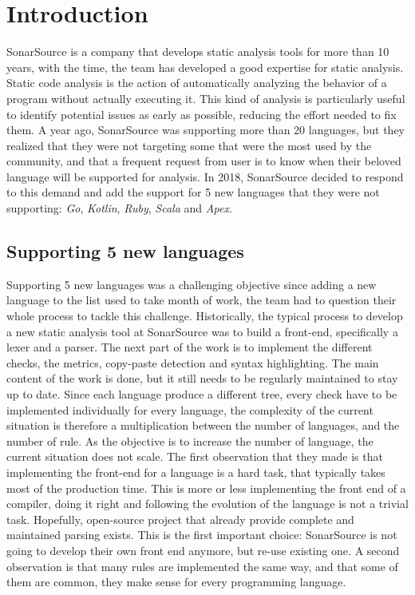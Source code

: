 \section{Introduction}
\label{sec:introduction}
SonarSource is a company that develops static analysis tools for more than 10 years, with the time, the team has developed a good expertise for static analysis.
Static code analysis is the action of automatically analyzing the behavior of a program without actually executing it.
This kind of analysis is particularly useful to identify potential issues as early as possible, reducing the effort needed to fix them.
A year ago, SonarSource was supporting more than 20 languages, but they realized that they were not targeting some that were the most used by the community, and that a frequent request from user is to know when their beloved language will be supported for analysis. 
In 2018, SonarSource decided to respond to this demand and add the support for 5 new languages that they were not supporting: \emph{Go}, \emph{Kotlin}, \emph{Ruby}, \emph{Scala} and \emph{Apex}.

\subsection{Supporting 5 new languages}
\label{subsec:5_new_languages}
Supporting 5 new languages was a challenging objective since adding a new language to the list used to take month of work, the team had to question their whole process to tackle this challenge.
Historically, the typical process to develop a new static analysis tool at SonarSource was to build a front-end, specifically a lexer and a parser.
The next part of the work is to implement the different checks, the metrics, copy-paste detection and syntax highlighting. The main content of the work is done, but it still needs to be regularly maintained to stay up to date.
Since each language produce a different tree, every check have to be implemented individually for every language, the complexity of the current situation is therefore a multiplication between the number of languages, and the number of rule. 
As the objective is to increase the number of language, the current situation does not scale.
The first observation that they made is that implementing the front-end for a language is a hard task, that typically takes most of the production time. This is more or less implementing the front end of a compiler, doing it right and following the evolution of the language is not a trivial task.
Hopefully, open-source project that already provide complete and maintained parsing exists. 
This is the first important choice: SonarSource is not going to develop their own front end anymore, but re-use existing one.
A second observation is that many rules are implemented the same way, and that some of them are common, they make sense for every programming language.


